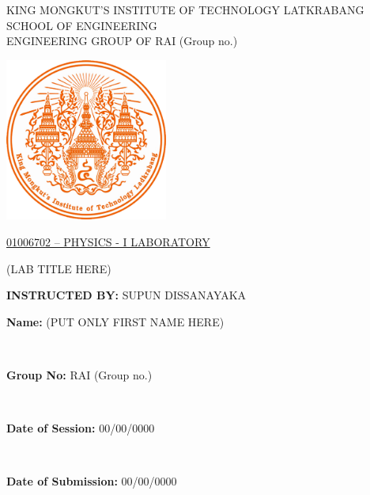 \documentclass[12pt,a4paper]{article}
\newcommand{\groupNumber}{(Group no.)} %
\newcommand{\labTitle}{(LAB TITLE HERE)} %
\newcommand{\studentNames}{(PUT ONLY FIRST NAME HERE)} %
\newcommand{\sessionDate}{00/00/0000} %
\newcommand{\submissionDate}{00/00/0000} %
\begin{document}
\begin{center}
	\vspace*{36pt}

	{\fontsize{14}{16}\selectfont
		KING MONGKUT’S INSTITUTE OF TECHNOLOGY LATKRABANG\\
		SCHOOL OF ENGINEERING\\
		ENGINEERING GROUP OF RAI \groupNumber
	}

	\vspace{42pt}

	\includegraphics[width=0.4\textwidth]{kmitl_logo.png}

	\vspace{56pt}

	{\fontsize{16}{18}\selectfont
		\underline{01006702 – PHYSICS - I LABORATORY}\\
	}

	\vspace{32pt}

	\labTitle

	\vspace{60pt}

	\begin{flushleft}
		\textbf{INSTRUCTED BY:} \quad SUPUN DISSANAYAKA
	\end{flushleft}

	\vfill

	\begin{flushright}
		\parbox{8cm}{\textbf{Name:} \studentNames}\\
		\parbox{8cm}{\textbf{Group No:} RAI \groupNumber}\\
		\parbox{8cm}{\textbf{Date of Session:} \sessionDate}\\
		\parbox{8cm}{\textbf{Date of Submission:} \submissionDate}
	\end{flushright}

	\vspace{36pt}
\end{center}

\newpage
\end{document}
